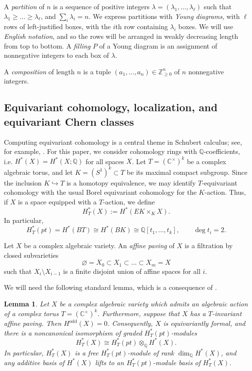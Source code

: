 \documentclass[11pt]{amsart}
\numberwithin{equation}{section}
\newtheorem{lemma}[theorem]{Lemma}
\theoremstyle{definition}
\newcommand{\CC}{{\mathbb{C}}}
\newcommand{\QQ}{{\mathbb{Q}}}
\newcommand{\ZZ}{{\mathbb{Z}}}
\begin{document}
A \emph{partition} of $n$ is a sequence of positive integers $\lambda = (\lambda_1,\dots,\lambda_\ell)$ such that $\lambda_1 \geq \dots \geq \lambda_\ell$, and $\sum_i \lambda_i = n$. We express partitions with \emph{Young diagrams}, with $\ell$ rows of left-justified boxes, with the $i$th row containing $\lambda_i$ boxes. We will use \emph{English notation}, and so the rows will be arranged in weakly decreasing length from top to bottom. A \emph{filling} $P$ of a Young diagram is an assignment of nonnegative integers to each box of $\lambda$. 

A \emph{composition} of length $n$ is a tuple $(a_1,\dots,a_n) \in \ZZ_{\geq 0}^n$ of $n$ nonnegative integers. 

\subsection{Equivariant cohomology, localization, and equivariant Chern classes}

Computing equivariant cohomology is a central theme in Schubert calculus; see, for example, \cite{AF,GKM}. For this paper, we consider cohomology rings with $\QQ$-coefficients, i.e.
$H^*(X)=H^*(X;\QQ)$ for all spaces $X$. Let $T=(\CC^\times)^k$ be a complex
algebraic torus, and let $K=(S^1)^k\subset T$ be its maximal compact subgroup.
Since the inclusion $K\hookrightarrow T$ is a homotopy equivalence, we may
identify $T$-equivariant cohomology with the usual Borel equivariant cohomology
for the $K$-action. Thus, if $X$ is a space equipped with a $T$-action, we define
\[
H_T^*(X):=H^*(EK\times_K X).
\]
In particular,
\[
H_T^*(pt)=H^*(BT)\cong H^*(BK)\cong \QQ[t_1,\dots,t_k],
\qquad \deg t_i=2.
\]

Let $X$ be a complex algebraic variety. An \emph{affine paving} of $X$ is a
filtration by closed subvarieties
\[
\varnothing = X_0 \subset X_1 \subset \dots \subset X_m=X
\]
such that $X_i\setminus X_{i-1}$ is a finite disjoint union of affine spaces for
all $i$.

We will need the following standard lemma, which is a consequence of
\cite[Theorem~14.1]{GKM}.

\begin{lemma}\label{lem: aff-paving-induces-basis}
    Let $X$ be a complex algebraic variety which admits an algebraic action of a complex torus $T=(\CC^\times)^k$. Furthermore, suppose that $X$ has a $T$-invariant affine paving.
    Then $H^{\mathrm{odd}}(X)=0$. Consequently, $X$ is equivariantly formal, and
    there is a noncanonical isomorphism of graded $H_T^*(pt)$-modules
    \[
        H_T^*(X) \cong H_T^*(pt)\otimes_{\QQ} H^*(X).
    \]
    In particular, $H_T^*(X)$ is a free $H_T^*(pt)$-module of rank
    $\dim_{\QQ} H^*(X)$, and any additive basis of $H^*(X)$ lifts to an
    $H_T^*(pt)$-module basis of $H_T^*(X)$.
\end{lemma}
\end{document}
